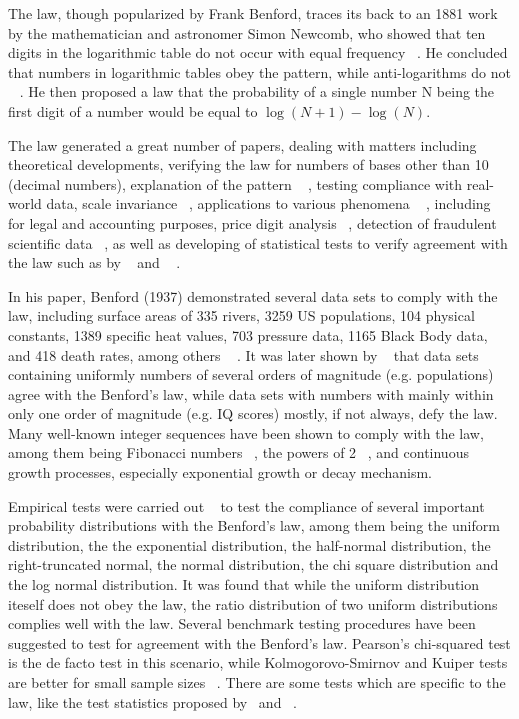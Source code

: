 The law, though popularized by Frank Benford, traces its back to an 1881 work by the mathematician and astronomer Simon Newcomb, who showed that ten digits in the logarithmic table do not occur with equal frequency ~\citep{Newcomb:1996}.  He concluded that numbers in logarithmic tables obey the pattern, while anti-logarithms do not ~ \citep{steven}. He then proposed a law that the probability of a single number N being the first digit of a number would be equal to  $\log({N+1})-\log({N})$.   

The law generated a great number of papers, dealing with matters including theoretical developments, verifying the law for numbers of bases other than 10 (decimal numbers), explanation of the pattern ~ \citep{fewster}, testing compliance with real-world data, scale invariance ~\citep{roger}, applications to various phenomena  ~ \citep{diek}, including for legal and accounting purposes, price digit analysis ~\citep{morrow}, detection of fraudulent scientific data ~\citep{seh}, as well as developing of statistical tests to verify agreement with the law such as by ~\citet{leemis} and ~ \citet{cho}. 

In his paper, Benford (1937) demonstrated several data sets to comply with the law, including surface areas of 335 rivers, 3259 US populations, 104 physical constants, 1389 specific heat values, 703 pressure data, 1165 Black Body data, and 418 death rates, among others ~ \citep{kvam}. It was later shown by ~\citet{theo} that data sets containing uniformly numbers of several orders of magnitude (e.g. populations) agree with the Benford’s law, while data sets with numbers with mainly within only one order of magnitude (e.g. IQ scores) mostly, if not always, defy the law. Many well-known integer sequences have been shown to comply with the law, among them being Fibonacci numbers ~\citep{washt}, the powers of 2 ~\citep{raimi}, and continuous growth processes, especially exponential growth or decay mechanism. 

Empirical tests were carried out ~\citep{formann} to test the compliance of several important probability distributions with the Benford's law, among them being the uniform distribution, the the exponential distribution, the half-normal distribution, the right-truncated normal, the normal distribution, the chi square distribution and the log normal distribution. It was found that while the uniform distribution iteself does not obey the law, the ratio distribution of two uniform distributions complies well with the law. Several benchmark testing procedures have been suggested to test for agreement with the Benford’s law. Pearson’s chi-squared test is the de facto test in this scenario, while Kolmogorovo-Smirnov and Kuiper tests are better for small sample sizes ~\citep{steph}.  There are some tests which are specific to the law, like the test statistics proposed by~\citet{leemis} and ~\citet{cho}. 

